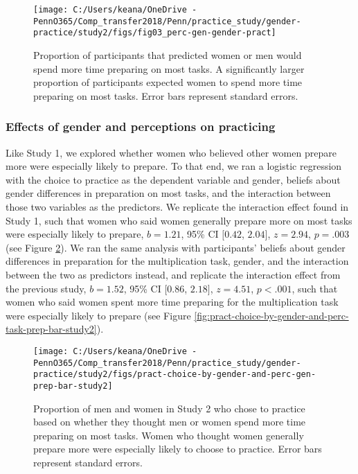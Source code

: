 \documentclass[letterpaper, nobind]{templates/ociamthesis}
\begin{document}
\begin{figure}

{\centering \texttt{[image: C:/Users/keana/OneDrive - PennO365/Comp\_transfer2018/Penn/practice\_study/gender-practice/study2/figs/fig03\_perc-gen-gender-pract]} 

}

\caption{Proportion of participants that predicted women or men would spend more time preparing on most tasks. A significantly larger proportion of participants expected women to spend more time preparing on most tasks. Error bars represent standard errors.}\label{fig:s206}
\end{figure}

\hypertarget{effects-of-gender-and-perceptions-on-practicing-2}{%
\subsubsection{Effects of gender and perceptions on practicing}\label{effects-of-gender-and-perceptions-on-practicing-2}}

Like Study 1, we explored whether women who believed other women prepare more were especially likely to prepare. To that end, we ran a logistic regression with the choice to practice as the dependent variable and gender, beliefs about gender differences in preparation on most tasks, and the interaction between those two variables as the predictors. We replicate the interaction effect found in Study 1, such that women who said women generally prepare more on most tasks were especially likely to prepare, \(b = 1.21\), 95\% CI \([0.42\), \(2.04]\), \(z = 2.94\), \(p = .003\) (see Figure \ref{fig:pract-choice-by-gender-and-perc-gen-prep-bar-study2}). We ran the same analysis with participants' beliefs about gender differences in preparation for the multiplication task, gender, and the interaction between the two as predictors instead, and replicate the interaction effect from the previous study, \(b = 1.52\), 95\% CI \([0.86\), \(2.18]\), \(z = 4.51\), \(p < .001\), such that women who said women spent more time preparing for the multiplication task were especially likely to prepare (see Figure \ref{fig:pract-choice-by-gender-and-perc-task-prep-bar-study2}).

\begin{figure}

{\centering \texttt{[image: C:/Users/keana/OneDrive - PennO365/Comp\_transfer2018/Penn/practice\_study/gender-practice/study2/figs/pract-choice-by-gender-and-perc-gen-prep-bar-study2]} 

}

\caption{Proportion of men and women in Study 2 who chose to practice based on whether they thought men or women spend more time preparing on most tasks. Women who thought women generally prepare more were especially likely to choose to practice. Error bars represent standard errors.}\label{fig:pract-choice-by-gender-and-perc-gen-prep-bar-study2}
\end{figure}
\end{document}
